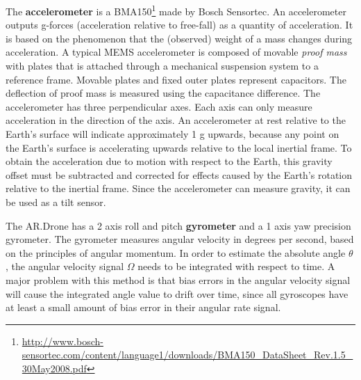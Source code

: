 The \textbf{accelerometer} is a BMA150\footnote{\url{http://www.bosch-sensortec.com/content/language1/downloads/BMA150_DataSheet_Rev.1.5_30May2008.pdf}} made by Bosch Sensortec.
An accelerometer outputs g-forces (acceleration relative to free-fall) as a quantity of acceleration.
It is based on the phenomenon that the (observed) weight of a mass changes during acceleration.
A typical MEMS accelerometer is composed of movable \textit{proof mass} with plates that is attached through a mechanical suspension system to a reference frame.
Movable plates and fixed outer plates represent capacitors. The deflection of proof mass is measured using the capacitance difference.
The accelerometer has three perpendicular axes. Each axis can only measure acceleration in the direction of the axis.
An accelerometer at rest relative to the Earth's surface will indicate approximately 1 g upwards, because any point on the Earth's surface is accelerating upwards relative to the local inertial frame.
To obtain the acceleration due to motion with respect to the Earth, this gravity offset must be subtracted and corrected for effects caused by the Earth's rotation relative to the inertial frame.
Since the accelerometer can measure gravity, it can be used as a tilt sensor.

The AR.Drone has a 2 axis roll and pitch \textbf{gyrometer} and a 1 axis yaw precision gyrometer.
The gyrometer measures angular velocity in degrees per second, based on the principles of angular momentum.
In order to estimate the absolute angle $\theta$, the angular velocity signal $\Omega$ needs to be integrated with respect to time.
A major problem with this method is that bias errors in the angular velocity signal will cause the integrated angle value to drift over time, since all gyroscopes have at least a small amount of bias error in their angular rate signal.

